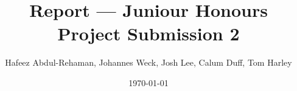 \title{Report --- Juniour Honours Project Submission 2}
\author{Hafeez Abdul-Rehaman, Johannes Weck, Josh Lee, Calum Duff, Tom Harley}
\date{\today}
